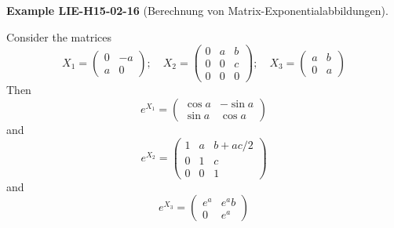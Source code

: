 \documentclass[10pt, letterpaper]{article}
\newcommand{\CustomHeading}[3]{%
  \par\medskip\noindent%
  \textbf{#1 #2} \textnormal{(#3)}.\enskip%
}
\newenvironment{EXA}[2]{\begin{unitbox}\CustomHeading{Example}{#1}{#2}}{\end{unitbox}}
\begin{document}
\begin{EXA}{LIE-H15-02-16}{Berechnung von Matrix-Exponentialabbildungen}
Consider the matrices
$$
X_{1}=\left(\begin{array}{rr}
0 & -a \\
a & 0
\end{array}\right) ; \quad X_{2}=\left(\begin{array}{ccc}
0 & a & b \\
0 & 0 & c \\
0 & 0 & 0
\end{array}\right) ; \quad X_{3}=\left(\begin{array}{cc}
a & b \\
0 & a
\end{array}\right)
$$
Then
$$
e^{X_{1}}=\left(\begin{array}{rr}
\cos a & -\sin a \\
\sin a & \cos a
\end{array}\right)
$$
and
$$
e^{X_{2}}=\left(\begin{array}{ccc}
1 & a & b+a c / 2 \\
0 & 1 & c \\
0 & 0 & 1
\end{array}\right)
$$
and
$$
e^{X_{3}}=\left(\begin{array}{cc}
e^{a} & e^{a} b \\
0 & e^{a}
\end{array}\right)
$$


\end{EXA}
\end{document}
